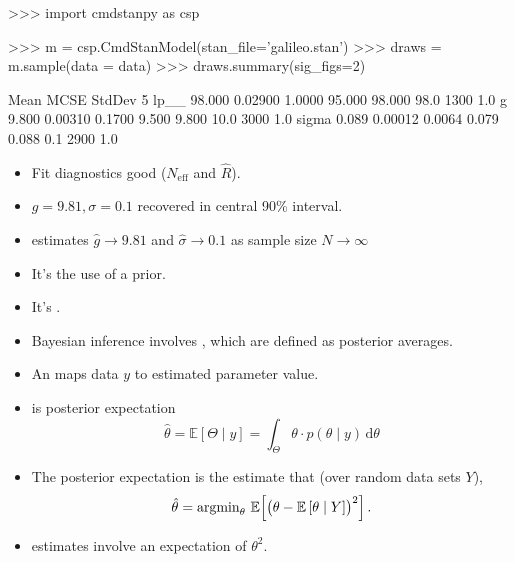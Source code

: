 \documentclass[10pt]{report}
\begin{document}
\begin{stancode}
>>> import cmdstanpy as csp

>>> m = csp.CmdStanModel(stan_file='galileo.stan')
>>> draws = m.sample(data = data)
>>> draws.summary(sig_figs=2)
  
         Mean     MCSE  StdDev      5%
lp__   98.000  0.02900  1.0000  95.000  98.000  98.0   1300    1.0
g       9.800  0.00310  0.1700   9.500   9.800  10.0   3000    1.0
sigma   0.089  0.00012  0.0064   0.079   0.088   0.1   2900    1.0
\end{stancode}
\begin{itemize}
\item Fit diagnostics good ($N_\text{eff}$ and $\widehat{R}$).
\item $g = 9.81, \sigma = 0.1$ recovered in
  central 90\% interval.
\item estimates $\widehat{g} \rightarrow 9.81$ and $\widehat{\sigma} \rightarrow 0.1$ as
  sample size $N \rightarrow \infty$
\end{itemize}



\begin{itemize}
\item It's  the use of a prior.
\item It's .
\item Bayesian inference involves ,
  which are defined as posterior averages.
\end{itemize}

\begin{itemize}
\item An  maps data $y$ to estimated parameter value.
\item {} is posterior expectation
  $$
  \hat{\theta} = \mathbb{E}[\Theta \mid y] = \int_\Theta \theta \cdot
  p(\theta \mid y) \, \textrm{d}\theta
  $$
\item The posterior expectation is the estimate that  (over random data sets $Y$),
  $$
  \hat{\theta} = \textrm{argmin}_\theta \ \mathbb{E}\!\left[\left( \strut\theta -
      \mathbb{E}\left[\theta \mid Y\right]\right)^2\right].
  $$
\item {} estimates involve an expectation of $\theta^2$.
\end{itemize}
  
\end{document}

